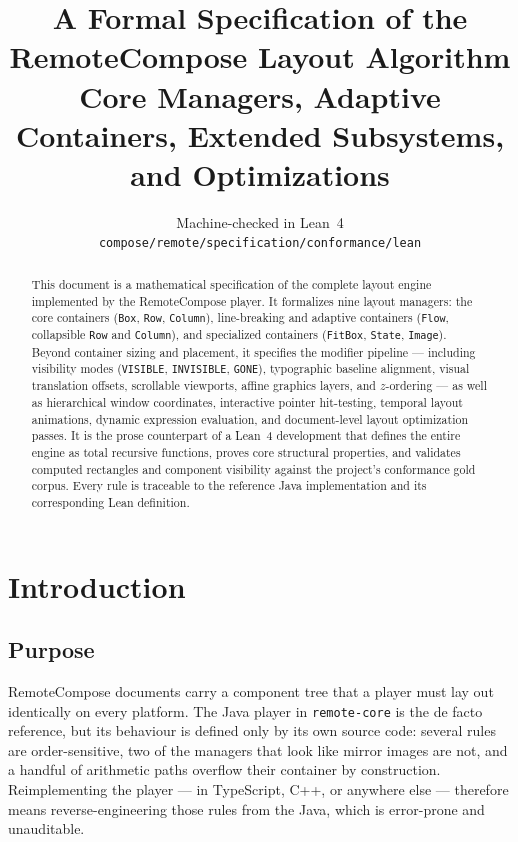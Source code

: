 \documentclass[11pt,a4paper]{article}
\title{\bfseries A Formal Specification of the\\ RemoteCompose Layout Algorithm\\[4pt]
  \large Core Managers, Adaptive Containers, Extended Subsystems, and Optimizations}
\author{Machine-checked in Lean~4 \\
  \texttt{compose/remote/specification/conformance/lean}}
\date{}
\newcommand{\jv}[1]{\texttt{#1}}       %
\newcommand{\file}[1]{\texttt{#1}}
\theoremstyle{definition}
\theoremstyle{plain}
\theoremstyle{remark}
\begin{document}
\maketitle

\begin{abstract}
\noindent
This document is a mathematical specification of the complete layout engine
implemented by the RemoteCompose player. It formalizes nine layout managers:
the core containers (\jv{Box}, \jv{Row}, \jv{Column}),
line-breaking and adaptive containers (\jv{Flow}, collapsible \jv{Row} and \jv{Column}),
and specialized containers (\jv{FitBox}, \jv{State}, \jv{Image}).
Beyond container sizing and placement, it specifies the modifier pipeline
--- including visibility modes (\jv{VISIBLE}, \jv{INVISIBLE}, \jv{GONE}),
typographic baseline alignment, visual translation offsets, scrollable viewports,
affine graphics layers, and $z$-ordering --- as well as hierarchical window coordinates,
interactive pointer hit-testing, temporal layout animations, dynamic
expression evaluation, and document-level layout optimization passes.
It is the prose counterpart of a Lean~4 development that defines the entire engine
as total recursive functions, proves core structural properties, and validates
computed rectangles and component visibility against the project's conformance
gold corpus. Every rule is traceable to the reference Java implementation and its
corresponding Lean definition.
\end{abstract}

\tableofcontents

\section{Introduction}

\subsection{Purpose}

RemoteCompose documents carry a component tree that a player must lay out
identically on every platform. The Java player in \file{remote-core} is the de
facto reference, but its behaviour is defined only by its own source code:
several rules are order-sensitive, two of the managers that look like mirror
images are not, and a handful of arithmetic paths overflow their container by
construction. Reimplementing the player --- in TypeScript, C++, or anywhere else
--- therefore means reverse-engineering those rules from the Java, which is
error-prone and unauditable.
\end{document}
